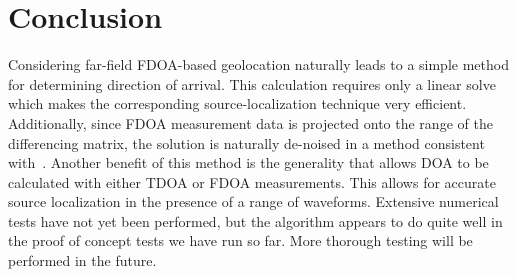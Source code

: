 \section{Conclusion}
\label{s:conclusion}
Considering far-field FDOA-based geolocation naturally leads to a simple method for determining direction of arrival. This calculation requires only a linear solve which makes the corresponding source-localization technique very efficient. Additionally, since FDOA measurement data is projected onto the range of the differencing matrix, the solution is naturally de-noised in a method consistent with~\cite{Schmidt1996,Compagnoni2017}. Another benefit of this method is the generality that allows DOA to be calculated with either TDOA or FDOA measurements. This allows for accurate source localization in the presence of a range of waveforms. Extensive numerical tests have not yet been performed, but the algorithm appears to do quite well in the proof of concept tests we have run so far. More thorough testing will be performed in the future.
